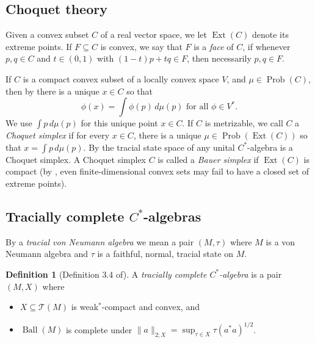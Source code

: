 \documentclass[10pt]{amsart}
\theoremstyle{definition}
\newtheorem{defn}[thm]{Definition}
\numberwithin{equation}{section}
\newcommand{\cT}{{\mathcal T}}
\DeclareMathOperator{\Ball}{Ball}
\DeclareMathOperator{\Ext}{Ext}
\DeclareMathOperator{\Prob}{Prob}
\begin{document}
\subsection{Choquet theory}

Given a convex subset $C$ of a real vector space, we let $\Ext(C)$ denote its extreme points. If $F\subseteq C$ is convex, we say that $F$ is a \emph{face} of $C$, if whenever $p,q\in C$ and $t\in (0,1)$ with $(1-t)p+tq\in F$, then necessarily $p,q\in F$.

If $C$ is a compact convex subset of a locally convex space $V$, and $\mu\in \Prob(C)$, then by \cite[Theorem 3.27]{GrandpaRudin} there is a unique $x\in C$ so that 
\[\phi(x)=\int \phi(p)\,d\mu(p) \text{ for all $\phi\in V^{*}$}.\]
We use $\int p\,d\mu(p)$ for this unique point $x\in C$. If $C$ is metrizable, we call $C$ a \emph{Choquet simplex} if for every $x\in C$, there is a unique $\mu\in \Prob(\Ext(C))$ so that $x=\int p\,d\mu(p)$. By \cite[Theorem 3.1.18]{Sakai} the tracial state space of any unital $C^{*}$-algebra is a Choquet simplex. A Choquet simplex $C$ is called a \emph{Bauer simplex} if $\Ext(C)$ is compact (by \cite[comments before Proposition V.7.9]{Conway}, even finite-dimensional convex sets may fail to have a closed set of extreme points). 


\subsection{Tracially complete $C^{*}$-algebras}

By a \emph{tracial von Neumann algebra} we mean a pair $(M,\tau)$ where $M$ is a von Neumann algebra and $\tau$ is a faithful, normal, tracial state on $M$.

\begin{defn}[Definition 3.4 of\cite{TraciallyComplete}]
A \emph{tracially complete $C^{*}$-algebra} is a pair $(M,X)$ where 
\begin{itemize}
    \item $X\subseteq \cT(M)$ is weak$^{*}$-compact and convex, and
    \item $\Ball(M)$ is complete under $\|a\|_{2;X}=\sup_{\tau\in X}\tau(a^{*}a)^{1/2}$. 
\end{itemize}
    
\end{defn}
\end{document}
